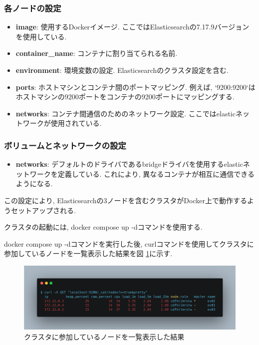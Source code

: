 \documentclass[a4j,12pt,]{jarticle}
\begin{document}
\subsubsection*{各ノードの設定}
\begin{itemize}
  \item \textbf{image}: 使用するDockerイメージ. ここではElasticsearchの7.17.9バージョンを使用している.
  \item \textbf{container\_name}: コンテナに割り当てられる名前.
  \item \textbf{environment}: 環境変数の設定. Elasticsearchのクラスタ設定を含む.
  \item \textbf{ports}: ホストマシンとコンテナ間のポートマッピング. 例えば, `9200:9200`はホストマシンの9200ポートをコンテナの9200ポートにマッピングする.
  \item \textbf{networks}: コンテナ間通信のためのネットワーク設定. ここではelasticネットワークが使用されている.
\end{itemize}

\subsubsection*{ボリュームとネットワークの設定}
\begin{itemize}
  \item \textbf{networks}: デフォルトのドライバであるbridgeドライバを使用するelasticネットワークを定義している. これにより, 異なるコンテナが相互に通信できるようになる.
\end{itemize}

この設定により, Elasticsearchの3ノードを含むクラスタがDocker上で動作するようセットアップされる.

クラスタの起動には, docker compose up -dコマンドを使用する.

docker compose up -dコマンドを実行した後, curlコマンドを使用してクラスタに参加しているノードを一覧表示した結果を図 \ref{p1}に示す.

\begin{figure}[H]
  \begin{center}
    \includegraphics[width=160mm]{curl-same.png}
    \caption{クラスタに参加しているノードを一覧表示した結果}
    \label{p1}
  \end{center}
\end{figure}
\end{document}
